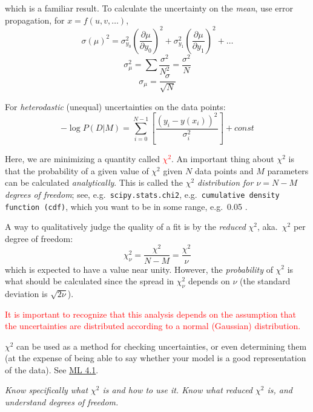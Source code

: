 \documentclass[12pt]{article}
\begin{document}
which is a familiar result. To calculate the uncertainty on the
\emph{mean}, use error propagation, for $x=f(u,v,\ldots)$,
    $$ \sigma(\mu)^2 = \sigma_{y_0}^2
    \left( \frac{\partial{\mu}}{\partial{y}_0}\right)^2
    + \sigma_{y_1}^2
    \left( \frac{\partial{\mu}}{\partial{y}_1}\right)^2
    + \ldots $$
    $$ \sigma_{\mu}^{2} = \sum\frac{\sigma^{2}}{N^{2}} = \frac{\sigma^{2}}{N}$$
    $$ \sigma_{\mu} = \frac{\sigma}{\sqrt{N}} $$

For \emph{heterodastic} (unequal) uncertainties on the data points:
$$ -\log P(D|M) = \sum_{i=0}^{N-1}\left[
\frac{(y_i-y(x_i))^{2}}{\sigma_{i}^{2}}\right] + const $$

Here, we are minimizing a quantity called \textcolor{red}
{$\chi^2$}. An important thing about $\chi^2$ is that the probability
of a given value of $\chi^2$ given $N$ data points and $M$ parameters
can be calculated \emph{analytically}. This is called the
\emph{$\chi^2$ distribution for $\nu = N-M$ degrees of freedom};
see, e.g.\ \texttt{scipy.stats.chi2}, e.g.\ \texttt{cumulative
density function (cdf)}, which you want to be in some range, e.g.\
0.05 .

A way to qualitatively judge the quality of a fit is by the
\emph{reduced} $\chi^2$, aka.\ $\chi^2$ per degree of freedom:
    $$  \chi_{\nu}^2 = \frac{\chi^2}{N-M} = \frac{\chi^2}{\nu}    $$
which is expected to have a value near unity.
However, the \emph{probability} of $\chi^2$ is what should be calculated since the
spread in $\chi_{\nu}^2$ depends on $\nu$ (the standard deviation
is $\sqrt{2\nu}$).

\textcolor{red}{It is important to recognize that this analysis depends
on the assumption that the uncertainties are distributed according to
a normal (Gaussian) distribution.}

$\chi^2$ can be used as a method for checking uncertainties, or even
determining them (at the expense of being able to say whether your
model is a good representation of the data).
See \href{http://astronomy.nmsu.edu/holtz/a575/images/ML4.1.png}
{ML 4.1}.

\colorbox{hl}{\parbox{0.9\textwidth}
{\emph{Know specifically what $\chi^2$ is and how to use it.
Know what reduced $\chi^2$ is, and understand degrees
of freedom.
}}}
\end{document}
